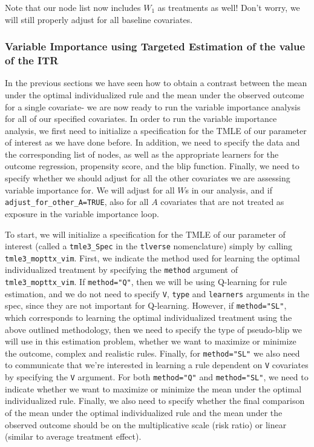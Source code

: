 \documentclass[12pt, krantz2,]{krantz}
\theoremstyle{definition}
\theoremstyle{definition}
\theoremstyle{definition}
\newcommand{\1}{\mathbbm{1}}
\begin{document}
Note that our node list now includes \(W_1\) as treatments as well! Don't worry,
we will still properly adjust for all baseline covariates.

\hypertarget{variable-importance-using-targeted-estimation-of-the-value-of-the-itr}{%
\subsubsection{Variable Importance using Targeted Estimation of the value of the ITR}\label{variable-importance-using-targeted-estimation-of-the-value-of-the-itr}}

In the previous sections we have seen how to obtain a contrast between the mean
under the optimal individualized rule and the mean under the observed outcome
for a single covariate- we are now ready to run the variable importance analysis
for all of our specified covariates. In order to run the variable importance
analysis, we first need to initialize a specification for the TMLE of our
parameter of interest as we have done before. In addition, we need to specify
the data and the corresponding list of nodes, as well as the appropriate
learners for the outcome regression, propensity score, and the blip function.
Finally, we need to specify whether we should adjust for all the other
covariates we are assessing variable importance for. We will adjust for all \(W\)s
in our analysis, and if \texttt{adjust\_for\_other\_A=TRUE}, also for all \(A\) covariates
that are not treated as exposure in the variable importance loop.

To start, we will initialize a specification for the TMLE of our parameter of
interest (called a \texttt{tmle3\_Spec} in the \texttt{tlverse} nomenclature) simply by calling
\texttt{tmle3\_mopttx\_vim}. First, we indicate the method used for learning the optimal
individualized treatment by specifying the \texttt{method} argument of
\texttt{tmle3\_mopttx\_vim}. If \texttt{method="Q"}, then we will be using Q-learning for rule
estimation, and we do not need to specify \texttt{V}, \texttt{type} and \texttt{learners} arguments
in the spec, since they are not important for Q-learning. However, if
\texttt{method="SL"}, which corresponds to learning the optimal individualized
treatment using the above outlined methodology, then we need to specify the type
of pseudo-blip we will use in this estimation problem, whether we want to
maximize or minimize the outcome, complex and realistic rules. Finally, for
\texttt{method="SL"} we also need to communicate that we're interested in learning a
rule dependent on \texttt{V} covariates by specifying the \texttt{V} argument. For both
\texttt{method="Q"} and \texttt{method="SL"}, we need to indicate whether we want to maximize
or minimize the mean under the optimal individualized rule. Finally, we also
need to specify whether the final comparison of the mean under the optimal
individualized rule and the mean under the observed outcome should be on the
multiplicative scale (risk ratio) or linear (similar to average treatment
effect).
\end{document}
